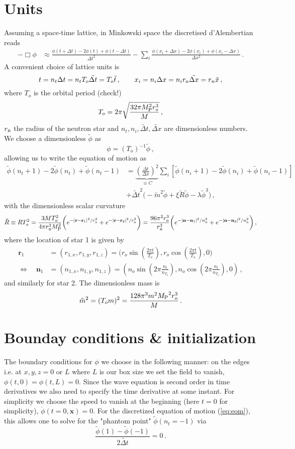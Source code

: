 \documentclass[a4paper,11pt]{article}
\newcommand{\ee}[1]{\begin{equation}#1\end{equation}}
\newcommand{\ea}[1]{\begin{align}#1\end{align}}
\providecommand{\f}[2]{\frac{{#1}}{{#2}}}
\begin{document}
\section{Units}
Assuming a space-time lattice, in Minkowski space the discretised d'Alembertian reads
\ea{-\Box\phi&\approx\f{\phi(t+\Delta t)-2\phi(t)+\phi(t-\Delta t)}{\Delta t^2}-\sum_i\f{\phi(x_i+\Delta x)-2\phi(x_i)+\phi(x_i-\Delta x)}{\Delta x^2}%
\,.}
A convenient choice of lattice units is
\ee{t = n_t\Delta t = n_t T_o\tilde{\Delta t}=T_o\tilde{t}\,,\qquad x_i = n_i\Delta x = n_i r_{\rm n}\tilde{\Delta x}=r_n\tilde{x}\,,}
where $T_o$ is the orbital period ({\color{red}check!})
\ee{T_o=2\pi\sqrt{\f{32\pi M_{\rm P}^2r_o^3}{M}}\,,}
$r_{\rm n}$ the radius of the neutron star and $n_t,n_i,\tilde{\Delta t},\tilde{\Delta x}$ are dimensionless numbers. We choose a dimensionless $\tilde{\phi}$ as
\ee{\phi=(T_o)^{-1}\tilde{\phi}\,,}
allowing us to write the equation of motion as
\ea{{\tilde{\phi}(n_t+1)-2\tilde{\phi}(n_t)+\tilde{\phi}(n_t-1)}&=\underbrace{\left(\f{\Delta t}{\Delta x}\right)^2}_{\equiv C}\sum_i\left[{\tilde{\phi}(n_i+1)-2\tilde{\phi}(n_i)+\tilde{\phi}(n_i-1)}\right]\nonumber \\&+\tilde{\Delta t}^2\bigg(-\tilde{m}^2\tilde{\phi}+\xi\tilde{R}\tilde{\phi}-\lambda \tilde{\phi}^3\bigg)\,,\label{eq:eom}}
with the dimensionless scalar curvature
\ee{\tilde{R}\equiv RT_o^2=\f{3 MT_o^2}{4\pi r_{\rm n}^3M_{\rm P}^2}\bigg(e^{-|\mathbf{r}-\mathbf{r}_1|^2/r_{\rm n}^2}+e^{-|\mathbf{r}-\mathbf{r}_2|^2/r_{\rm n}^2}\bigg)=\f{96\pi^2r_o^3}{r_{\rm n}^3}\bigg(e^{-|\mathbf{n}-\mathbf{n}_1|^2/n_{\rm n}^2}+e^{-|\mathbf{n}-\mathbf{n}_2|^2/n_{\rm n}^2}\bigg)\,,}
where the location of star 1 is given by 
\ea{\mathbf{r}_{1}&=\left({r}_{1,x},{r}_{1,y},{r}_{1,z}\right)=\bigg(r_o\sin\left(\f{2\pi t}{T_o}\right),r_o\cos\left(\f{2\pi t}{T_o}\right),0\bigg)\nonumber \\\Leftrightarrow\quad
\mathbf{n}_{1}&=\left({n}_{1,x},{n}_{1,y},{n}_{1,z}\right)=\left(n_o\sin\left(2\pi \f{n_t}{n_{T_o}}\right),n_o\cos\left(2\pi \f{n_t}{n_{T_o}}\right),0\right)\,,}
and similarly for star 2. The dimensionless mass is
\ee{\tilde{m}^2= (T_om)^2=\frac{128 \pi ^3 m^2 {M_{\rm P}}^2 r_{o}^3}{M}\,.}
\section{Bounday conditions \& initialization}
The boundary conditions for $\phi$ we choose in the following manner: on the edges i.e. at $x,y,z = 0$ or $L$ where $L$ is our box size we set the field to vanish, $\phi(t,0)=\phi(t,L)=0$. Since the wave equation is second order in time derivatives we also need to specify the time derivative at some instant. For simplicity we choose the speed to vanish at the beginning (here $t=0$ for simplicity), $\dot{\phi}(t=0,\mathbf{x})=0$. For the discretized equation of motion (\ref{eq:eom}), this allows one to solve for the "phantom point" $\tilde{\phi}(n_t=-1)$ via
\ee{\f{\tilde{\phi}(1)-\tilde{\phi}(-1)}{2\tilde{\Delta t}}=0\,.}
\end{document}
